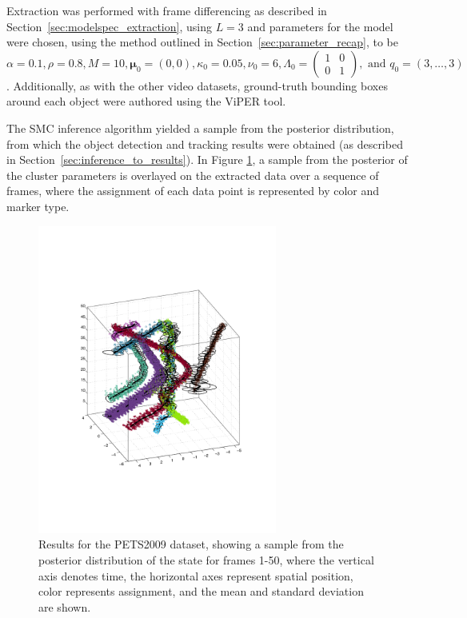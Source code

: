 \documentclass[smallcondensed, final]{svjour3}
\begin{document}
Extraction was performed with frame differencing as described in Section~\ref{sec:modelspec_extraction}, using $L=3$ and parameters for the model were chosen, using the method outlined in Section~\ref{sec:parameter_recap}, to be $\alpha = 0.1, \rho = 0.8, M = 10, \boldsymbol{\mu}_{0} = (0,0), \kappa_{0} = 0.05, \nu_{0} = 6, \Lambda_{0} = \left( \begin{smallmatrix} 1&0\\ 0&1 \end{smallmatrix} \right), \text{ and } q_{0} = (3, \ldots, 3)$. Additionally, as with the other video datasets, ground-truth bounding boxes around each object were authored using the ViPER tool.

The SMC inference algorithm yielded a sample from the posterior distribution, from which the object detection and tracking results were obtained (as described in Section~\ref{sec:inference_to_results}). In Figure \ref{fig:pets2009_results}, a sample from the posterior of the cluster parameters is overlayed on the extracted data over a sequence of frames, where the assignment of each data point is represented by color and marker type.

\begin{figure}[!]
  \centering
  \includegraphics[width=0.7\textwidth]{../img/pets2009_1-50_front.pdf}
  \caption{Results for the PETS2009 dataset, showing a sample from the posterior distribution of the state for frames 1-50, where the vertical axis denotes time, the horizontal axes represent spatial position, color represents assignment, and the mean and standard deviation are shown.}
  \label{fig:pets2009_results}
\end{figure}
\end{document}
